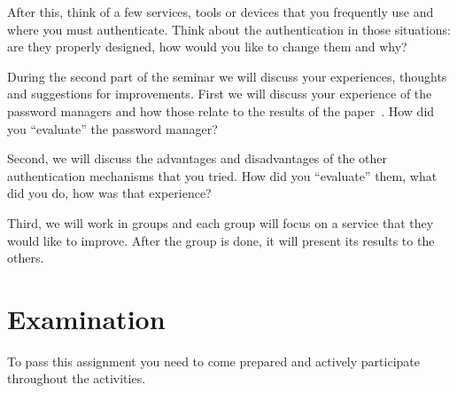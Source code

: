 After this, think of a few services, tools or devices that you frequently use 
and where you must authenticate.
Think about the authentication in those situations: are they properly designed, 
how would you like to change them and why?

During the second part of the seminar we will discuss your experiences, 
thoughts and suggestions for improvements.
First we will discuss your experience of the password managers and how those 
relate to the results of the 
paper~\cite{UsabilityEvaluationOfPasswordManagers}.
How did you \enquote{evaluate} the password manager?

Second, we will discuss the advantages and disadvantages of the other 
authentication mechanisms that you tried.
How did you \enquote{evaluate} them, what did you do, how was that experience?

Third, we will work in groups and each group will focus on a service that they 
would like to improve.
After the group is done, it will present its results to the others.


\section{Examination}%
\label{sec:exam}

To pass this assignment you need to come prepared and actively participate 
throughout the activities.


\printbibliography
